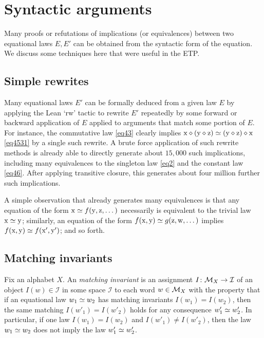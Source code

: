 
\section{Syntactic arguments}\label{syntactic-sec}

Many proofs or refutations of implications (or equivalences) between two equational laws $E,E'$ can be obtained from the syntactic form of the equation.  We discuss some techniques here that were useful in the ETP.

\subsection{Simple rewrites}\label{rewrite-sec}

Many equational laws $E'$ can be formally deduced from a given law $E$ by applying the Lean `rw' tactic to rewrite $E'$ repeatedly by some forward or backward application of $E$ applied to arguments that match some portion of $E$.  For instance, the commutative law \eqref{eq43} clearly implies $\mathrm{x} \diamond (\mathrm{y} \diamond \mathrm{z}) \simeq (\mathrm{y} \diamond \mathrm{z}) \diamond \mathrm{x}$ \eqref{eq4531}
by a single such rewrite.  A brute force application of such rewrite methods is already able to directly generate about $15,000$ such implications, including many equivalences to the singleton law \eqref{eq2} and the constant law \eqref{eq46}.  After applying transitive closure, this generates about four million further such implications.

A simple observation that already generates many equivalences is that any equation of the form $\mathrm{x} \simeq f(\mathrm{y},\mathrm{z},\dots)$ necessarily is equivalent to the trivial law $\mathrm{x} \simeq \mathrm{y}$; similarly, an equation of the form $f(\mathrm{x},\mathrm{y}) \simeq g(\mathrm{z},\mathrm{w},\dots)$ implies $f(\mathrm{x},\mathrm{y}) \simeq f(\mathrm{x}',\mathrm{y}')$; and so forth. 

\subsection{Matching invariants}

Fix an alphabet $X$. An \emph{matching invariant} is an assignment $I \colon {\mathcal{M}}_X \to {\mathcal I}$ of an object $I(w) \in {\mathcal I}$ in some space ${\mathcal I}$ to each word $w \in {\mathcal{M}}_X$ with the property that if an equational law $w_1 \simeq w_2$ has matching invariants $I(w_1)=I(w_2)$, then the same matching $I(w'_1) = I(w'_2)$ holds for any consequence $w'_1 \simeq w'_2$.  In particular, if one law $I(w_1)=I(w_2)$ and $I(w'_1) \neq I(w'_2)$, then the law $w_1 \simeq w_2$ does not imply the law $w'_1 \simeq w'_2$.

